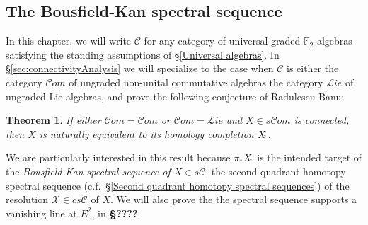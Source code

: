 \documentclass[11pt]{amsart}
\theoremstyle{plain}
\newtheorem{thm}{Theorem}[section]
\theoremstyle{definition}
\newcommand{\scrL}{\mathscr{L}}
\newcommand{\scrC}{\mathscr{C}}
\newcommand{\calX}{\mathcal{X}}
\newcommand{\calC}{\mathcal{C}}
\newcommand{\calc}{\mathcal{C}}
\theoremstyle{plain}
\newcommand{\F}{\mathbb{F}}
\newcommand{\algs}{{\scrC\!\textit{om}}}
\newcommand{\liealgs}{{\scrL\!\textit{ie}}}
\newcommand{\algcat}{{\scrC\!\textit{om}}}%
\begin{document}
\begin{Bousfield-Kan spectral sequence}
\section{\textbf{The Bousfield-Kan spectral sequence}}\label{Bousfield-Kan spectral sequence}



In this chapter, we will write $\calC$ for any category of universal graded $\F_2$-algebras satisfying the standing assumptions of \S\ref{Universal algebras}. In \S\ref{sec:connectivityAnalysis} we will specialize to the case when $\calc$ is either the category $\algs$  of ungraded non-unital commutative algebras the category $\liealgs$ of ungraded Lie algebras, and prove the following conjecture of Radulescu-Banu:
\begin{thm}\label{completenesstheorem}
If either $\algcat=\algs$ or $\algcat=\liealgs$ and $X\in s\algcat$ is connected, then $X$ is naturally equivalent to its homology completion $X\hat{\ }$.
\end{thm}
We are particularly interested in this result because $\pi_*X\hat{\ }$ is the intended target of the \emph{Bousfield-Kan spectral sequence of $X\in s\calc$}, the second quadrant homotopy spectral sequence (c.f.\ \S\ref{Second quadrant homotopy spectral sequences}) of the resolution $\calX\in cs\calc$ of $X$. We will also prove the the spectral sequence supports a vanishing line at $E^2$, in \textbf{\S????}.



\end{Bousfield-Kan spectral sequence}
\end{document}
